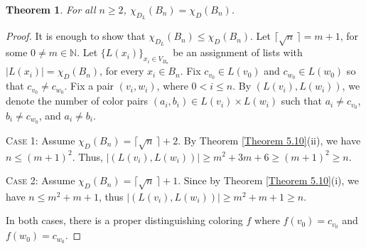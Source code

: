 \documentclass[12pt,reqno,a4paper]{amsart}
\theoremstyle{definition}
\newtheorem{thm}[defn]{Theorem}
\begin{document}
\begin{thm}\label{Theorem 5.11}
  {\em For all $n\geq 2$, $\chi_{D_L}(B_n) = \chi_D(B_n)$.}
\end{thm}
\begin{proof}
   It is enough to show that $\chi_{D_L}(B_n) \leq \chi_D(B_n)$. Let $\lceil \sqrt{n}\,\rceil = m+1$, for some $0\neq m\in \mathbb{N}$. Let $\{L(x_i)\}_{x_i\in V_{B_n}}$ be an assignment of lists with $|L(x_i)| = \chi_{D}(B_n)$, for every $x_i\in B_n$. Fix $c_{v_0}\in L(v_0)$ and $c_{w_0}\in L(w_0)$ so that $c_{v_0}\neq c_{w_0}$. Fix a pair $(v_i,w_i)$, where $0<i\leq n$. By $(L(v_i), L(w_i))$, we denote the number of color pairs $(a_i,b_i)\in L(v_i)\times L(w_i)$ such that $a_i\neq c_{v_0}$, $b_i\neq c_{w_0}$, and $a_{i}\neq b_{i}$.
    
\noindent \textsc{Case 1:} Assume $\chi_D(B_n) =\lceil \sqrt{n}\,\rceil+2$. By Theorem \ref{Theorem 5.10}(ii), we have $n\leq (m+1)^2$. Thus, $|(L(v_i), L(w_i))|\geq  m^2 + 3m + 6 \geq (m+1)^2 \geq n$. 

\noindent \textsc{Case 2:} Assume $\chi_D(B_n) =\lceil \sqrt{n}\,\rceil+1$. Since by Theorem \ref{Theorem 5.10}(i), we have $n \leq m^2 + m + 1$, thus $|(L(v_i), L(w_i))|\geq m^2 + m + 1\geq n$.

\noindent In both cases, there is a proper distinguishing coloring $f$ where $f(v_0) = c_{v_0}$ and $f(w_0)=c_{w_0}$.
\end{proof}
\end{document}
